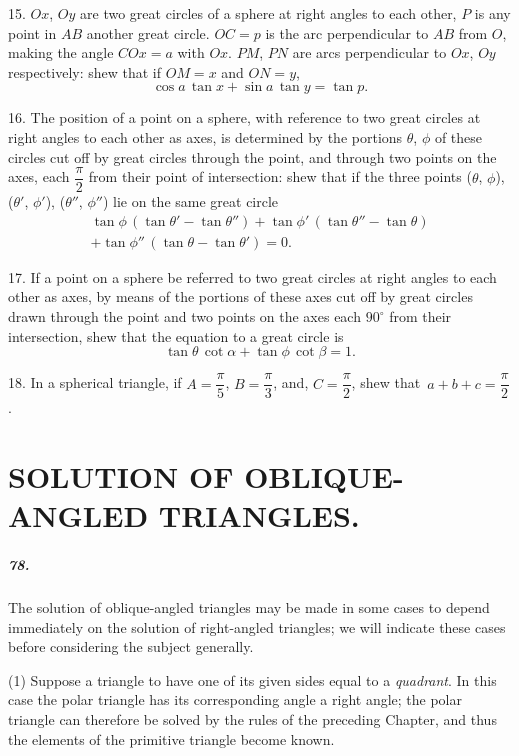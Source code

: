 \documentclass{book}[2004/02/16]
\begin{document}
\begin{mainmatter}
\begin{spacing}{1.3}
15. $Ox$, $Oy$ are two great circles of a sphere at right angles to
each other, $P$ is any point in $AB$ another great circle. $OC = p$ is
the arc perpendicular to $AB$ from $O$, making the angle $COx = a$
with $Ox$. $PM$, $PN$ are arcs perpendicular to $Ox$, $Oy$ respectively:
shew that if $OM = x$ and $ON = y$,
\[
\cos a\, \tan x + \sin a\, \tan y = \tan p.
\]

16. The position of a point on a sphere, with reference to two
great circles at right angles to each other as axes, is determined
by the portions $\theta$, $\phi$ of these circles cut off by great circles through
the point, and through two points on the axes, each $\dfrac{\pi}{2}$ from their
point of intersection: shew that if the three points ($\theta$, $\phi$), ($\theta'$, $\phi'$),
($\theta''$, $\phi''$) lie on the same great circle
\begin{gather*}
  \tan \phi\, (\tan \theta' - \tan \theta'')
+ \tan \phi'\, (\tan \theta'' - \tan \theta)\\
+ \tan \phi''\, (\tan \theta - \tan \theta') = 0.
\end{gather*}

17. If a point on a sphere be referred to two great circles at
right angles to each other as axes, by means of the portions of
these axes cut off by great circles drawn through the point and
two points on the axes each $90^\circ$ from their intersection, shew that
the equation to a great circle is
\[
\tan \theta\, \cot \alpha + \tan \phi\, \cot \beta = 1.
\]

18. In a spherical triangle, if $A = \dfrac{\pi}{5}$, $B = \dfrac{\pi}{3}$, and, $C = \dfrac{\pi}{2}$, shew that\, $a + b + c = \dfrac{\pi}{2}$.

\chapter[Solution of Oblique-Angled Triangles.]{SOLUTION OF OBLIQUE-ANGLED TRIANGLES.}

\paragraph{78.} The solution of oblique-angled triangles may be made in
some cases to depend immediately on the solution of right-angled
triangles; we will indicate these cases before considering the subject
generally.

(1) Suppose a triangle to have one of its given sides equal to
a \textit{quadrant}. In this case the polar triangle has its corresponding
angle a right angle; the polar triangle can therefore be solved by
the rules of the preceding Chapter, and thus the elements of the
primitive triangle become known.


\end{spacing}
\end{mainmatter}
\end{document}
